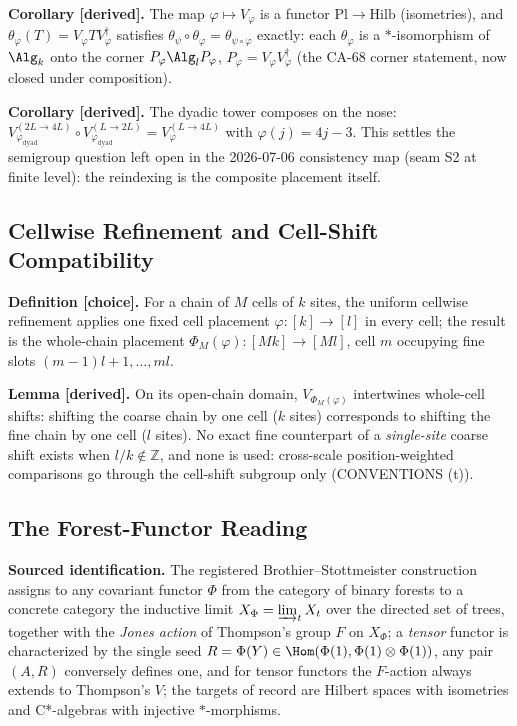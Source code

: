 \textbf{Corollary [derived].}  The map \(\varphi\mapsto V_\varphi\) is a
functor \(\mathrm{Pl}\to\mathrm{Hilb}\) (isometries), and
\(\theta_\varphi(T)=V_\varphi TV_\varphi^\dagger\) satisfies
\(\theta_\psi\circ\theta_\varphi=\theta_{\psi\circ\varphi}\) exactly: each
\(\theta_\varphi\) is a \(*\)-isomorphism of \(\Alg_k\) onto the corner
\(P_\varphi\Alg_lP_\varphi\), \(P_\varphi=V_\varphi V_\varphi^\dagger\)
(the CA-68 corner statement, now closed under composition).

\textbf{Corollary [derived].}  The dyadic tower composes on the nose:
\(V_{\varphi_{\mathrm{dyad}}}^{(2L\to4L)}\circ
  V_{\varphi_{\mathrm{dyad}}}^{(L\to2L)}
 =V_{\varphi}^{(L\to4L)}\) with \(\varphi(j)=4j-3\).  This settles the
semigroup question left open in the 2026-07-06 consistency map (seam S2 at
finite level): the reindexing is the composite placement itself.

\subsection{Cellwise Refinement and Cell-Shift Compatibility}

\textbf{Definition [choice].}  For a chain of \(M\) cells of \(k\) sites, the
uniform cellwise refinement applies one fixed cell placement
\(\varphi:[k]\to[l]\) in every cell; the result is the whole-chain placement
\(\Phi_M(\varphi):[Mk]\to[Ml]\), cell \(m\) occupying fine slots
\((m-1)l+1,\dots,ml\).

\textbf{Lemma [derived].}  On its open-chain domain, \(V_{\Phi_M(\varphi)}\)
intertwines whole-cell shifts: shifting the coarse chain by one cell
(\(k\) sites) corresponds to shifting the fine chain by one cell (\(l\)
sites).  No exact fine counterpart of a \emph{single-site} coarse shift
exists when \(l/k\notin\mathbb Z\), and none is used: cross-scale
position-weighted comparisons go through the cell-shift subgroup only
(CONVENTIONS (t)).

\subsection{The Forest-Functor Reading}

\textbf{Sourced identification.}  The registered Brothier--Stottmeister
construction assigns to any covariant functor \(\Phi\) from the category of
binary forests to a concrete category the inductive limit
\(X_\Phi=\varinjlim_{t}X_t\) over the directed set of trees, together with
the \emph{Jones action} of Thompson's group \(F\) on \(X_\Phi\); a
\emph{tensor} functor is characterized by the single seed
\(R=\Phi(Y)\in\Hom(\Phi(1),\Phi(1)\otimes\Phi(1))\), any pair \((A,R)\)
conversely defines one, and for tensor functors the \(F\)-action always
extends to Thompson's \(V\); the targets of record are Hilbert spaces with
isometries and C*-algebras with injective \(*\)-morphisms.

